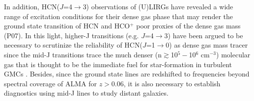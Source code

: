 \documentclass[12pt,a4paper]{article}  %
\newcommand{\ncrit}{\mbox{$n_crit$}\xspace}
\newcommand{\LIR}{\mbox{L$_{\rm IR}$}\xspace}
\newcommand{\rarr}{$\rightarrow$}
\newcommand{\ahcn}{\mbox{HCN($J$=1\rarr0)}\xspace}
\newcommand{\dhcn}{\mbox{HCN($J$=4\rarr3)}\xspace}
\newcommand{\hcop}{HCO$^+$\xspace}
\newcommand{\Lp}[1][CO]{\mbox{$L^{\prime}_\textrm{\fontsize{8pt}{12pt}\selectfont{#1}}$}}
\begin{document}
%

In addition, \dhcn observations of (U)LIRGs have revealed a wide range of
excitation conditions for their dense gas phase that may render the ground state transition of 
HCN and \hcop poor proxies of the dense gas mass (P07).
In this light, higher-J transitions (e.g. $J$=4\rarr3) have been argued to be necessary to scrutinize the
reliability of \ahcn as dense gas mass tracer since the mid-J transitions
trace the much denser (n$\gtrsim$10$^5-$10$^6$ cm$^{-3}$) molecular gas that is 
thought to be the immediate fuel for star-formation in turbulent GMCs \citep{Shirley03a, KM05}. 
Besides, since the ground state lines are redshifted to frequencies beyond spectral coverage of ALMA
for $z>$0.06, it is also necessary to establish diagnostics using mid-J lines to study distant galaxies.
\end{document}
